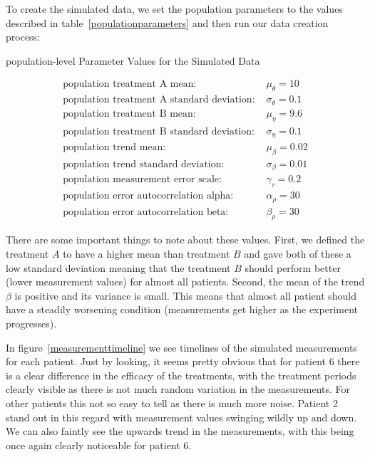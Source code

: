 \documentclass[12pt,a4paper,leqno]{report}
\theoremstyle{plain}
\theoremstyle{definition}
\theoremstyle{remark}
\begin{document}
To create the simulated data, we set the population parameters to the values described
in table\ \ref{populationparameters} and then run
our data creation process:

\begin{table}[H]
    \caption{population-level Parameter Values for the Simulated Data}\label{populationparameters}
    \begin{align}\label{}
        \text{population treatment A mean: } & \mu_{\theta} = 10 \nonumber \\
        \text{population treatment A standard deviation: } & \sigma_{\theta} = 0.1 \nonumber \\
        \text{population treatment B mean: } & \mu_{\eta} = 9.6 \nonumber \\
        \text{population treatment B standard deviation: } & \sigma_{\eta} = 0.1 \nonumber \\
        \text{population trend mean: } & \mu_{\beta} = 0.02 \nonumber \\
        \text{population trend standard deviation: } & \sigma_{\beta} = 0.01 \nonumber \\
        \text{population measurement error scale: } & \gamma_{\tau} = 0.2 \nonumber \\
        \text{population error autocorrelation alpha: } & \alpha_{\rho} = 30 \nonumber \\
        \text{population error autocorrelation beta: } & \beta_{\rho} = 30 \nonumber
    \end{align}
\end{table}

There are some important things to note about these values. First, we defined the
treatment \(A\) to have a higher mean than treatment \(B\) and gave both of these a low
standard deviation meaning that the treatment \(B\) should perform better (lower
measurement values) for almost all patients.
Second, the mean of the trend \(\beta \) is positive and its variance is small. This means
that almost all patient should have a steadily worsening condition (measurements get
higher as the experiment progresses).

In figure\ \ref{measurementtimeline} we see timelines of the simulated measurements for
each patient. Just by looking, it seems
pretty obvious that for patient 6 there is a clear difference in the efficacy of the
treatments, with the treatment periods clearly visible as there is not much random
variation in the measurements. For other patients this not so
easy to tell as there is much more noise. Patient 2 stand out in this regard with
measurement values swinging wildly up and down.  We can also faintly see the upwards trend in the
measurements, with this being once again clearly noticeable for patient 6.
\end{document}

